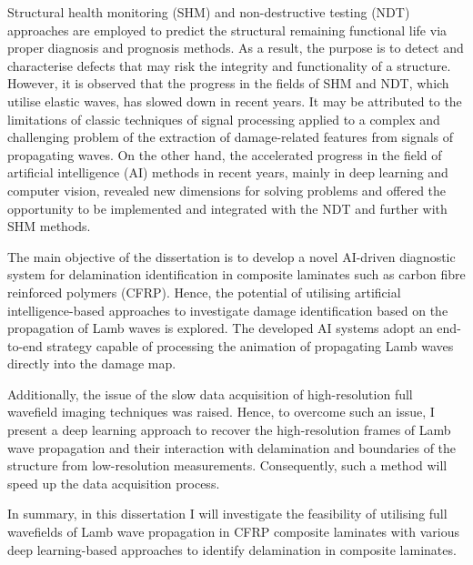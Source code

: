 {	
	Structural health monitoring (SHM) and non-destructive testing (NDT) approaches are employed to predict the structural remaining functional life via proper diagnosis and prognosis methods.
	As a result, the purpose is to detect and characterise defects that may risk the integrity and functionality of a structure.
	However, it is observed that the progress in the fields of SHM and NDT, which utilise elastic waves, has slowed down in recent years.
	It may be attributed to the limitations of classic techniques of signal processing applied to a complex and challenging problem of the extraction of damage-related features from signals of propagating waves.
	On the other hand, the accelerated progress in the field of artificial intelligence (AI) methods in recent years, mainly in deep learning and computer vision, revealed new dimensions for solving problems and offered the opportunity to be implemented and integrated with the NDT and further with SHM methods.
	
	The main objective of the dissertation is to develop a novel AI-driven diagnostic system for delamination identification in composite laminates such as carbon fibre reinforced polymers (CFRP).
	Hence, the potential of utilising artificial intelligence-based approaches to investigate damage identification based on the propagation of Lamb waves is explored.
	The developed AI systems adopt an end-to-end strategy capable of processing the animation of propagating Lamb waves directly into the damage map.
	
	Additionally, the issue of the slow data acquisition of high-resolution full wavefield imaging techniques was raised.
	Hence, to overcome such an issue, I present a deep learning approach to recover the high-resolution frames of Lamb wave propagation and their interaction with delamination and boundaries of the structure from low-resolution measurements.
	Consequently, such a method will speed up the data acquisition process.
	
	In summary, in this dissertation I will investigate the feasibility of utilising full wavefields of Lamb wave propagation in CFRP composite laminates with various deep learning-based approaches to identify delamination in composite laminates.
	
}

